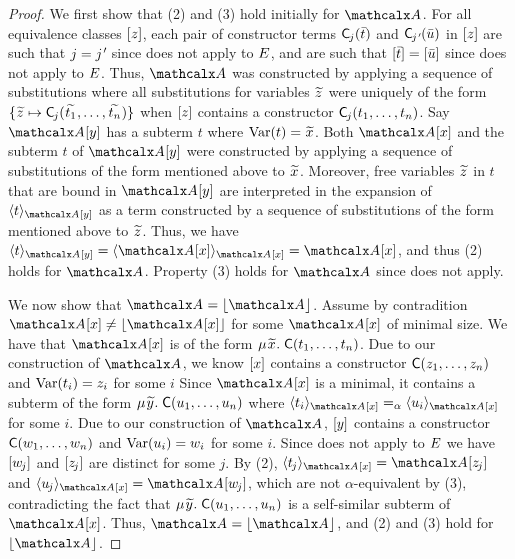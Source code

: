 \begin{rep}
\begin{proof}
We first show that (2) and (3) hold initially for $\Val$.
For all equivalence classes $[z]$,
each pair of constructor terms $\textsf{C}_{\kern-0.083333em j}( \bar t )$ and $\const{C}_{\negvthinspace\jPrime}( \vec u )$ in $[z]$
are such that $j = \jPrime$ since  does not apply to $E$,
and are such that $[ \bar t ] = [ \bar u ]$ since  does not apply to $E$.
Thus,
$\Val$ was constructed by applying a sequence of substitutions
where all substitutions for variables ${\Varec{z}}$
were uniquely of the form $\{ {\Varec{z}} \mapsto \const{C}_{\negvthinspace j}( {\Varec{t_1}}, \ldots, {\Varec{t_n}} ) \}$
when $[z]$ contains a constructor $\textsf{C}_{\kern-0.083333em j}( t_1, \ldots, t_n )$.
Say $\Val \ec{y}$ has a subterm $t$ where $\muvar(t) = {\Varec{x}}$.
Both $\Val \ec{x}$ and the subterm $t$ of $\Val \ec{y}$ were
constructed by applying a sequence of substitutions of the form mentioned above to ${\Varec{x}}$.
Moreover, free variables ${\Varec{z}}$ in $t$ that are bound in $\Val \ec{y}$ are interpreted in
the expansion of $\interp{\Val \ec{y}}{ t }$ as a term
constructed by a sequence of substitutions of the form mentioned above to ${\Varec{z}}$. %
Thus, we have
$\interp{\Val \ec{y}}{ t } = \interp{\Val \ec{x}}{ \Val \ec{x} } = \Val \ec{x}$, and thus (2) holds for $\Val$.
Property (3) holds for $\Val$ since  does not apply.

We now show that $\Val = \nf{\Val}$.
Assume by contradition $\Val \ec{x} \neq \nf{\Val \ec{x}}$ for some $\Val \ec{x}$ of minimal size.
We have that $\Val \ec{x}$ is of the form $\MU {\Varec{x}}.\; \const{C}( t_1, \ldots, t_n )$.
Due to our construction of $\Val$,
we know $[x]$ contains a constructor $\textsf{C}( z_1, \ldots, z_n )$ and $\mathrm{Var}( t_i ) = z_i$ for some $i$ %
Since $\Val \ec{x}$ is a minimal, it
contains a subterm of the form $\MU {\Varec{y}}.\; \const{C}( u_1, \ldots, u_n )$
where $\interp{\Val \ec{x}}{ t_i } \aequiv \interp{\Val \ec{x} }{ u_i }$ for some $i$. %
Due to our construction of $\Val$, $[y]$ contains a constructor $\textsf{C}( w_1, \ldots, w_n )$ and $\mathrm{Var}( u_i ) = w_i$ for some $i$. %
Since  does not apply to $E$
we have $[w_{\kern-0.083333em j}]$ and $[z_{\kern-0.083333em j}]$ are distinct for some $j$.
By (2), $\interp{\Val \ec{x}}{ t_{\negvthinspace j} } = \Val \ec{z_{\negvthinspace j}}$
and $\interp{\Val \ec{x}}{ u_{\negvthinspace j} } = \Val \ec{w_{\negvthinspace j}}$,
which are not $\alpha$-equivalent by (3), contradicting the fact that $\MU {\Varec{y}}.\; \const{C}( u_1, \ldots, u_n )$ is a self-similar subterm of $\Val \ec{x}$.
Thus, $\Val = \nf{\Val}$, and (2) and (3) hold for $\nf{\Val}$.


\end{proof}
\end{rep}
